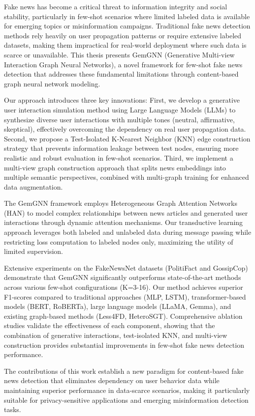\StartAbstract

Fake news has become a critical threat to information integrity and social stability, particularly in few-shot scenarios where limited labeled data is available for emerging topics or misinformation campaigns. Traditional fake news detection methods rely heavily on user propagation patterns or require extensive labeled datasets, making them impractical for real-world deployment where such data is scarce or unavailable. This thesis presents GemGNN (Generative Multi-view Interaction Graph Neural Networks), a novel framework for few-shot fake news detection that addresses these fundamental limitations through content-based graph neural network modeling.

Our approach introduces three key innovations: First, we develop a generative user interaction simulation method using Large Language Models (LLMs) to synthesize diverse user interactions with multiple tones (neutral, affirmative, skeptical), effectively overcoming the dependency on real user propagation data. Second, we propose a Test-Isolated K-Nearest Neighbor (KNN) edge construction strategy that prevents information leakage between test nodes, ensuring more realistic and robust evaluation in few-shot scenarios. Third, we implement a multi-view graph construction approach that splits news embeddings into multiple semantic perspectives, combined with multi-graph training for enhanced data augmentation.

The GemGNN framework employs Heterogeneous Graph Attention Networks (HAN) to model complex relationships between news articles and generated user interactions through dynamic attention mechanisms. Our transductive learning approach leverages both labeled and unlabeled data during message passing while restricting loss computation to labeled nodes only, maximizing the utility of limited supervision.

Extensive experiments on the FakeNewsNet datasets (PolitiFact and GossipCop) demonstrate that GemGNN significantly outperforms state-of-the-art methods across various few-shot configurations (K=3-16). Our method achieves superior F1-scores compared to traditional approaches (MLP, LSTM), transformer-based models (BERT, RoBERTa), large language models (LLaMA, Gemma), and existing graph-based methods (Less4FD, HeteroSGT). Comprehensive ablation studies validate the effectiveness of each component, showing that the combination of generative interactions, test-isolated KNN, and multi-view construction provides substantial improvements in few-shot fake news detection performance.

The contributions of this work establish a new paradigm for content-based fake news detection that eliminates dependency on user behavior data while maintaining superior performance in data-scarce scenarios, making it particularly suitable for privacy-sensitive applications and emerging misinformation detection tasks.

\EndAbstract
